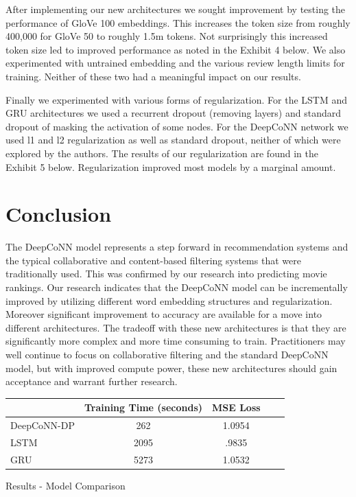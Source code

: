 \documentclass[10pt,twocolumn,letterpaper]{article}
\begin{document}
After implementing our new architectures we sought improvement by testing the performance of GloVe 100 embeddings. This increases the token size from roughly 400,000 for GloVe 50 to roughly 1.5m tokens. Not surprisingly this increased token size led to improved performance as noted in the Exhibit 4 below. We also experimented with untrained embedding and the various review length limits for training. Neither of these two had a meaningful impact on our results.  

Finally we experimented with various forms of regularization. For the LSTM and GRU architectures we used a recurrent dropout (removing layers) and standard dropout of masking the activation of some nodes. For the DeepCoNN network we used l1 and l2 regularization as well as standard dropout, neither of which were explored by the authors. The results of our regularization are found in the Exhibit 5 below. Regularization improved most models by a marginal amount.  


\section{Conclusion}

The DeepCoNN model represents a step forward in recommendation systems and the typical collaborative and content-based filtering systems that were traditionally used. This was confirmed by our research into predicting movie rankings. Our research indicates that the DeepCoNN model can be incrementally improved by utilizing different word embedding structures and regularization. Moreover significant improvement to accuracy are available for a move into different architectures. The tradeoff with these new architectures is that they are significantly more complex and more time consuming to train. Practitioners may well continue to focus on collaborative filtering and the standard DeepCoNN model, but with improved compute power, these new architectures should gain acceptance and warrant further research.  

\begin{exhibit}
\begin{center}
{\small
\begin{tabular}{l|cccc}
\hline
 & Training Time (seconds) & MSE Loss \\
\hline
DeepCoNN-DP & 262 & 1.0954   \\
LSTM & 2095 & .9835  \\
GRU & 5273 & 1.0532  \\
\hline
\end{tabular}
}
\end{center}
\caption{Results - Model Comparison}
\end{exhibit}
\end{document}
